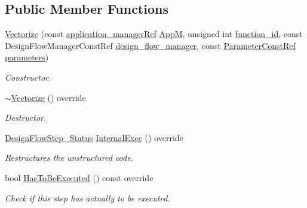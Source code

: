 \subsection*{Public Member Functions}
\begin{DoxyCompactItemize}
\item 
\hyperlink{classVectorize_a63e3a9d5b2598be2d76c34bc9c09ebf6}{Vectorize} (const \hyperlink{application__manager_8hpp_a04ccad4e5ee401e8934306672082c180}{application\+\_\+manager\+Ref} \hyperlink{classFrontendFlowStep_a0ac0d8db2a378416583f51c4faa59d15}{AppM}, unsigned int \hyperlink{classFunctionFrontendFlowStep_a58ef2383ad1a212a8d3f396625a4b616}{function\+\_\+id}, const Design\+Flow\+Manager\+Const\+Ref \hyperlink{classDesignFlowStep_ab770677ddf087613add30024e16a5554}{design\+\_\+flow\+\_\+manager}, const \hyperlink{Parameter_8hpp_a37841774a6fcb479b597fdf8955eb4ea}{Parameter\+Const\+Ref} \hyperlink{classDesignFlowStep_a802eaafe8013df706370679d1a436949}{parameters})
\begin{DoxyCompactList}\small\item\em Constructor. \end{DoxyCompactList}\item 
\hyperlink{classVectorize_a404b305e082437652cbc33be7ddb8904}{$\sim$\+Vectorize} () override
\begin{DoxyCompactList}\small\item\em Destructor. \end{DoxyCompactList}\item 
\hyperlink{design__flow__step_8hpp_afb1f0d73069c26076b8d31dbc8ebecdf}{Design\+Flow\+Step\+\_\+\+Status} \hyperlink{classVectorize_aecc4f293d0b0f625f26005582886ca48}{Internal\+Exec} () override
\begin{DoxyCompactList}\small\item\em Restructures the unstructured code. \end{DoxyCompactList}\item 
bool \hyperlink{classVectorize_a2001b38db34ec3dcff8e011436c3cd32}{Has\+To\+Be\+Executed} () const override
\begin{DoxyCompactList}\small\item\em Check if this step has actually to be executed. \end{DoxyCompactList}\end{DoxyCompactItemize}

